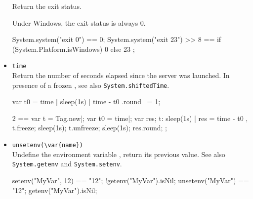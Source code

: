 \begin{itemize}
  Return the exit status.

  \begin{windows}
    Under Windows, the exit status is always 0.
  \end{windows}

\begin{urbiassert}[firstnumber=last]
System.system("exit 0") == 0;
System.system("exit 23") >> 8
       == { if (System.Platform.isWindows) 0 else 23 };
\end{urbiassert}


\item \lstinline|time|\\
  Return the number of seconds elapsed since the \urbi server was
  launched.  In presence of a frozen , see also
  \lstinline|System.shiftedTime|.
\begin{urbiassert}[firstnumber=last]
{ var t0 = time | sleep(1s) | time - t0 }.round ~= 1;

  2 ==
  {
    var t = Tag.new|;
    var t0 = time|;
    var res;
    t: { sleep(1s) | res = time - t0 },
    t.freeze;
    sleep(1s);
    t.unfreeze;
    sleep(1s);
    res.round;
  };
\end{urbiassert}

\item \lstinline|unsetenv(\var{name})|\\
  Undefine the environment variable , return its previous
  value.  See also \lstinline|System.getenv| and
  \lstinline|System.setenv|.

\begin{urbiassert}[firstnumber=last]
setenv("MyVar", 12) == "12";
!getenv("MyVar").isNil;
unsetenv("MyVar") == "12";
getenv("MyVar").isNil;
\end{urbiassert}


\end{itemize}

